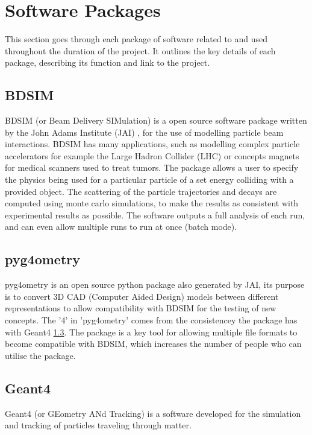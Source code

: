 \documentclass[12pt,a4paper]{article}
\begin{document}

\section{Software Packages}
\label{packs}
This section goes through each package of software related to and used throughout the duration of the project. It outlines the key details of each package, describing its function and link to the project.

\subsection{BDSIM}
\label{bdsim}
BDSIM (or Beam Delivery SIMulation) is a open source software package written by the John Adams Institute (JAI) \cite{jai}, for the use of modelling particle beam interactions. BDSIM has many applications, such as modelling complex particle accelerators for example the Large Hadron Collider (LHC) or concepts magnets for medical scanners used to treat tumors. The package allows a user to specify the physics being used for a particular particle of a set energy colliding with a provided object. The scattering of the particle trajectories and decays are computed using monte carlo simulations, to make the results as consistent with experimental results as possible. The software outputs a full analysis of each run, and can even allow multiple runs to run at once (batch mode).

\subsection{pyg4ometry}
\label{pyg}
pyg4ometry is an open source python package also generated by JAI, its purpose is to convert 3D CAD (Computer Aided Design) models between different representations to allow compatibility with BDSIM for the testing of new concepts. The '4' in 'pyg4ometry' comes from the consistencey the package has with Geant4 \ref{geant4}. The package is a key tool for allowing multiple file formats to become compatible with BDSIM, which increases the number of people who can utilise the package.

\subsection{Geant4}\label{geant4}
\label{g4}
Geant4 (or GEometry ANd Tracking) is a software developed for the simulation and tracking of particles traveling through matter.
\end{document}

